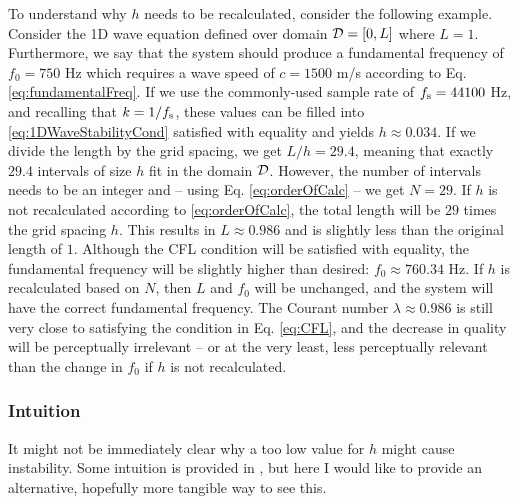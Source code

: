To understand why $h$ needs to be recalculated, consider the following example. Consider the 1D wave equation defined over domain $\mathcal{D} = [0, L]$ where $L = 1$. Furthermore, we say that the system should produce a fundamental frequency of $f_0 = 750$ Hz which requires a wave speed of $c = 1500$ m/s according to Eq. \eqref{eq:fundamentalFreq}. If we use the commonly-used sample rate of $f_\text{s} = 44100$ Hz, and recalling that $k = 1/f_\text{s}$, these values can be filled into \eqref{eq:1DWaveStabilityCond} satisfied with equality and yields $h \approx 0.034$. If we divide the length by the grid spacing, we get $L / h = 29.4$, meaning that exactly $29.4$ intervals of size $h$ fit in the domain $\mathcal{D}$. However, the number of intervals needs to be an integer and -- using Eq. \eqref{eq:orderOfCalc} -- we get $N = 29$. If $h$ is not recalculated according to \eqref{eq:orderOfCalc}, the total length will be $29$ times the grid spacing $h$. This results in $L \approx 0.986$ and is slightly less than the original length of $1$. Although the CFL condition will be satisfied with equality, the fundamental frequency will be slightly higher than desired: $f_0 \approx 760.34$ Hz. If $h$ is recalculated based on $N$, then $L$ and $f_0$ will be unchanged, and the system will have the correct fundamental frequency. The Courant number $\lambda \approx 0.986$ is still very close to satisfying the condition in Eq. \eqref{eq:CFL}, and the decrease in quality will be perceptually irrelevant -- or at the very least, less perceptually relevant than the change in $f_0$ if $h$ is not recalculated.


\subsubsection{Intuition}
It might not be immediately clear why a too low value for $h$ might cause instability. Some intuition is provided in \cite[Fig. 6.9]{theBible}, but here I would like to provide an alternative, hopefully more tangible way to see this. 

